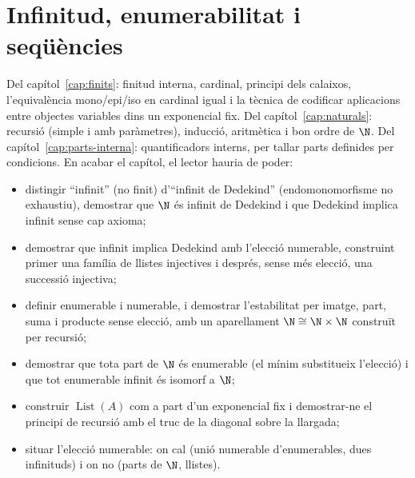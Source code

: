 \chapter{Infinitud, enumerabilitat i seqüències}\label{cap:infinitud}

\begin{objectius}
 Del capítol~\ref{cap:finits}: finitud interna, cardinal, principi dels calaixos, l'equivalència mono/epi/iso en cardinal igual i la tècnica de codificar aplicacions entre objectes variables dins un exponencial fix. Del capítol~\ref{cap:naturals}: recursió (simple i amb paràmetres), inducció, aritmètica i bon ordre de \(\N\). Del capítol~\ref{cap:parts-interna}: quantificadors interns, per tallar parts definides per condicions.
 En acabar el capítol, el lector hauria de poder:
\begin{itemize}
  \item distingir \enquote{infinit} (no finit) d'\enquote{infinit de Dedekind} (endomonomorfisme no exhaustiu), demostrar que \(\N\) és infinit de Dedekind i que Dedekind implica infinit sense cap axioma;
  \item demostrar que infinit implica Dedekind amb l'elecció numerable, construint primer una família de llistes injectives i després, sense més elecció, una successió injectiva;
  \item definir enumerable i numerable, i demostrar l'estabilitat per imatge, part, suma i producte sense elecció, amb un aparellament \(\N\cong\N\times\N\) construït per recursió;
  \item demostrar que tota part de \(\N\) és enumerable (el mínim substitueix l'elecció) i que tot enumerable infinit és isomorf a \(\N\);
  \item construir \(\operatorname{List}(A)\) com a part d'un exponencial fix i demostrar-ne el principi de recursió amb el truc de la diagonal sobre la llargada;
  \item situar l'elecció numerable: on cal (unió numerable d'enumerables, dues infinituds) i on no (parts de \(\N\), llistes).
\end{itemize}
\end{objectius}

